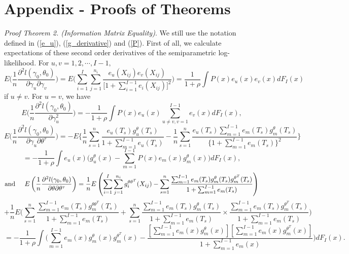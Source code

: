 \documentclass[12]{interact}
\theoremstyle{plain}%
\theoremstyle{definition}
\theoremstyle{remark}
\begin{document}
\section{Appendix - Proofs of Theorems}
\appendix
{\em Proof Theorem 2. (Information Matrix Equality)}. We still use the notation defined in (\ref{e_u}), (\ref{g_derivative}) and (\ref{P}). First of all, we calculate expectations of these second
order derivatives of the semiparametric log-likelihood. For $u, v =1, 2, \cdots, I-1,$
\begin{equation}
	E\Big(\frac{1}{n}\frac{\partial^2 l(\gamma_0, \theta_0)}{ \partial \gamma_u
		\partial \gamma_v}\Big)=E\Big( \sum_{i=1}^I\sum_{j=1}^{n_i}
	\frac{e_u( X_{ij}) e_v(X_{ij})}{\big[1+\sum_{i=1}^{I-1}e_i(X_{ij})\big]^2}\Big)= \frac{1}{1+\rho}
	\int P(x)e_u( x) e_v(x) dF_I(x) \label{gammauv}
\end{equation}
\noindent if $u\ne v $. For $u=v$, we have
\begin{equation}
	E\Big(\frac{1}{n}\frac{\partial^2l(\gamma_0, \theta_0 )}{\partial
		\gamma_u^2} \Big) =-\frac{1}{1+\rho}\int P(x)e_u(x)\sum_{u\ne v,v=1}^{I-1}e_v(x)dF_I(x),\label{gammauu}
\end{equation}
$$E\Big( \frac{1}{n}\frac{\partial^2 l(\gamma_0, \theta_0)}{\partial \gamma_u \partial
	\theta^\tau}\Big)=-E\Big\{\frac{1}{n}\sum_{s=1}^n
\frac{e_u(T_s) g_u^\theta(T_s)} {1+\sum_{m=1}^{I-1}e_u(T_s)}
- \frac{1}{n}\sum_{s=1}^n
\frac{e_u(T_s)\sum_{m=1}^{I-1}e_m(T_s)g_m^\theta(T_s)}{\{1+\sum_{m=1}^{I-1}e_m(T_s)\}^2}\Big\}$$
\begin{equation}
	= -\frac{1}{1+\rho}\int e_u(x)\Bigg(g_u^\theta(x)-
	\sum_{m=1}^{I-1}P(x)e_m(x)g_m^\theta(x)\Bigg)dF_I(x),\label{gammatheta}
\end{equation}
$$\mbox{and}\hspace{5mm}E \left(\frac{1}{n}\frac{\partial^2 l(\gamma_0,\theta_0)}{\partial \theta
	\partial \theta^\tau}\right)=\frac{1}{n}E\left(\sum_{i=1}^I\sum_{j=1}^{n_i}
g_i^{\theta\theta^T}(X_{ij})-\sum_{s=1}^n\frac{\sum_{m=1}^{I-1}
	e_m(T_s)g_m^\theta(T_s) g_m^{\theta^T}(T_s)}{1+\sum_{m=1}^{I-1}e_m(T_s)}
\right)$$
$$+\frac{1}{n}E\Bigg(\sum_{s=1}^n\frac{\sum_{m=1}^{I-1}e_m(T_s) g_m^{\theta\theta^T}(T_s)}{1+\sum_{m=1}^{I-1}e_m(T_s)}+\sum_{s=1}^n\frac{\sum_{m=1}^{I-1}
	e_m(T_s)g_m^\theta(T_s)}{1+\sum_{m=1}^{I-1}e_m(T_s)}\times \frac{\sum_{m=1}^{I-1}e_m(T_s)g_m^{\theta^T}(T_s)}
{1+\sum_{m=1}^{I-1}e_m(T_s)}\Bigg)$$
\begin{equation}
	=-\frac{1}{1+\rho}\int\Bigg(\sum_{m=1}^{I-1}e_m(x)g_m^\theta(x)g_m^{\theta^T}(x)
	-\frac{[\sum_{m=1}^{I-1}e_m(x) g_m^\theta(x)]
		[\sum_{m=1}^{I-1}e_m(x)g_m^{\theta^T}(x)]} {1+ \sum_{m=1}^{I-1
		}e_m(x)}\Bigg)dF_I(x).\label{theta_theta}
\end{equation}
\end{document}
